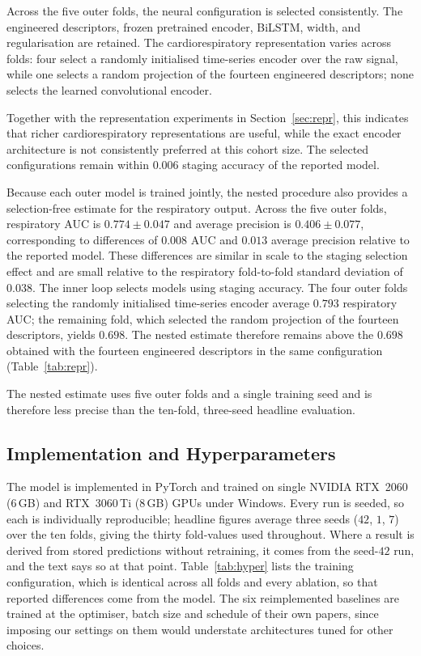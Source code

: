 \documentclass{ieeeaccess}
\begin{document}
Across the five outer folds, the neural configuration is selected consistently. The engineered descriptors, frozen pretrained encoder, BiLSTM, width, and
regularisation are retained. The cardiorespiratory representation varies across
folds: four select a randomly initialised time-series encoder over the raw signal,
while one selects a random projection of the fourteen engineered descriptors;
none selects the learned convolutional encoder.

Together with the representation experiments in Section~\ref{sec:repr}, this
indicates that richer cardiorespiratory representations are useful, while the
exact encoder architecture is not consistently preferred at this cohort size.
The selected configurations remain within $0.006$ staging accuracy of the
reported model.

Because each outer model is trained jointly, the nested procedure also provides a
selection-free estimate for the respiratory output. Across the five outer folds, respiratory
AUC is $0.774 \pm 0.047$ and average precision is $0.406 \pm 0.077$, corresponding to
differences of $0.008$ AUC and $0.013$ average precision relative to the reported model.
These differences are similar in scale to the staging selection effect and are small relative
to the respiratory fold-to-fold standard deviation of $0.038$. The inner loop selects models
using staging accuracy. The four outer folds selecting the randomly initialised time-series
encoder average $0.793$ respiratory AUC; the remaining fold, which selected the random
projection of the fourteen descriptors, yields $0.698$. The nested estimate therefore
remains above the $0.698$ obtained with the fourteen engineered descriptors in the same
configuration (Table~\ref{tab:repr}).

The nested estimate uses five outer folds and a single training seed and is therefore less precise than the ten-fold, three-seed headline evaluation.

\subsection{Implementation and Hyperparameters}
The model is implemented in PyTorch and trained on single NVIDIA RTX~2060 (6\,GB) and
RTX~3060\,Ti (8\,GB) GPUs under Windows. Every run is seeded, so each is individually reproducible; headline figures
average three seeds ($42$, $1$, $7$) over the ten folds, giving the thirty fold-values used
throughout. Where a result is derived from stored predictions without retraining, it comes
from the seed-$42$ run, and the text says so at that point.
Table~\ref{tab:hyper} lists the training configuration, which is identical across all folds
and every ablation, so that reported differences come from the model. The six reimplemented
baselines are trained at the optimiser, batch size and schedule of their own papers, since
imposing our settings on them would understate architectures tuned for other choices.
\end{document}
